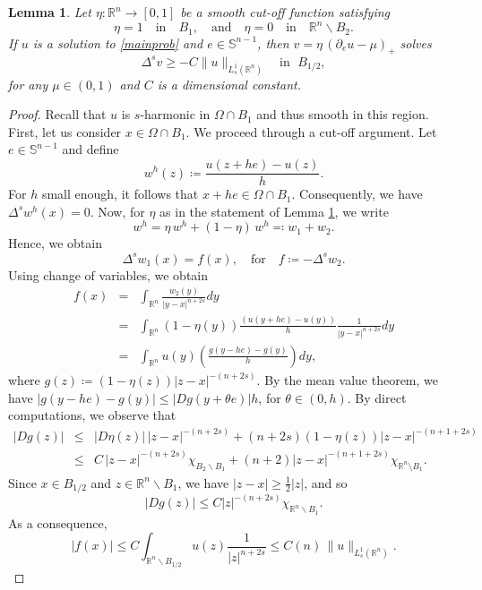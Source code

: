 \documentclass[reqno,11pt]{amsart}
\newtheorem{lemma}{Lemma}[section]
\numberwithin{equation}{section}
\numberwithin{equation}{section}
\begin{document}
\begin{lemma}\label{subsolution-lemma}
Let $\eta \colon \mathbb{R}^n \to [0,1]$ be a smooth cut-off function satisfying
$$
    \eta = 1 \quad \mbox{in} \quad  B_1, \quad \mbox{and} \quad \eta = 0 \quad \mbox{in} \quad \mathbb{R}^n \backslash B_2.
$$
If $u$ is a solution to \eqref{mainprob} and $e \in \mathbb{S}^{n-1}$, then $v = \eta\,(\partial_e u - \mu)_+$ solves
$$
    \Delta^s v \geq -C\|u\|_{L^1_s(\mathbb{R}^n)} \quad \mbox{in }\; B_{1/2},
$$
for any $\mu \in (0,1)$ and $C$ is a dimensional constant.
\end{lemma}
\begin{proof}
Recall that $u$ is $s$-harmonic in $\Omega \cap B_1$ and thus smooth in this region. First, let us consider $x \in \Omega \cap B_1$. We proceed through a cut-off argument. Let $e \in \mathbb{S}^{n-1}$ and define
$$
    w^h(z) \coloneqq \frac{u(z+he) - u(z)}{h}.
$$
For $h$ small enough, it follows that $x+he \in \Omega \cap B_1$. Consequently, we have $\Delta^s w^h(x) = 0$. Now, for $\eta$ as in the statement of Lemma \ref{subsolution-lemma}, we write
$$
    w^h = \eta\,w^h + (1-\eta)\,w^h \eqqcolon w_1 + w_2.
$$
Hence, we obtain
$$
    \Delta^s w_1(x) = f(x), \quad \mbox{for} \quad f \coloneqq -\Delta^s w_2.
$$
Using change of variables, we obtain
\begin{eqnarray*}
    f(x) & = & \int_{\mathbb{R}^n}\frac{w_2(y)}{|y-x|^{n+2s}}dy\\
        & = & \int_{\mathbb{R}^n}(1-\eta(y))\frac{(u(y+he)-u(y))}{h}\frac{1}{|y-x|^{n+2s}}dy\\
        & = & \int_{\mathbb{R}^n}u(y)\left(\frac{g(y-he)-g(y)}{h} \right)dy,
\end{eqnarray*}
where $g(z) \coloneqq (1-\eta(z))|z-x|^{-(n+2s)}$. By the mean value theorem, we have $|g(y-he)-g(y)| \leq |Dg(y + \theta e)|h$, for $\theta \in (0,h)$. By direct computations, we observe that
\begin{eqnarray*}
    |Dg(z)| & \leq & |D\eta(z)|\,|z-x|^{-(n+2s)} + (n+2s)(1-\eta(z))|z-x|^{-(n+1+2s)}\\
            & \leq & C\,|z-x|^{-(n+2s)}\chi_{B_2\backslash B_1} + (n+2)|z-x|^{-(n+1+2s)}\chi_{\mathbb{R}^n \setminus B_1}.
\end{eqnarray*}
Since $x \in B_{1/2}$ and $z \in \mathbb{R}^n \backslash B_1$, we have $|z-x| \geq \frac{1}{2}|z|$, and so
$$
    |Dg(z)| \leq C|z|^{-(n+2s)}\chi_{\mathbb{R}^n \backslash B_1}.
$$
As a consequence,
$$
    |f(x)| \leq C\int_{\mathbb{R}^n \backslash B_{1/2}} u(z) \frac{1}{|z|^{n+2s}} \leq C(n)\,\|u\|_{L^1_s(\mathbb{R}^n)}.
$$
\end{proof}
\end{document}
